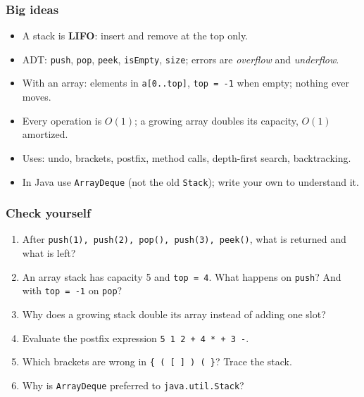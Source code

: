 \documentclass[aspectratio=169,10pt,compress]{beamer}
\begin{document}




\begin{frame}[t,fragile] \frametitle{Big ideas}
  \begin{itemize}
    \item A stack is \textbf{LIFO}: insert and remove at the top only.
    \item ADT: \texttt{push}, \texttt{pop}, \texttt{peek}, \texttt{isEmpty}, \texttt{size}; errors are \emph{overflow} and \emph{underflow}.
    \item With an array: elements in \texttt{a[0..top]}, \texttt{top = -1} when empty; nothing ever moves.
    \item Every operation is $O(1)$; a growing array doubles its capacity, $O(1)$ amortized.
    \item Uses: undo, brackets, postfix, method calls, depth-first search, backtracking.
    \item In Java use \texttt{ArrayDeque} (not the old \texttt{Stack}); write your own to understand it.
  \end{itemize}
\end{frame}




\begin{frame}[t,fragile] \frametitle{Check yourself}
  \begin{enumerate}\small
    \item After \texttt{push(1), push(2), pop(), push(3), peek()}, what is returned and what is left?
    \item An array stack has capacity 5 and \texttt{top = 4}. What happens on \texttt{push}? And with \texttt{top = -1} on \texttt{pop}?
    \item Why does a growing stack double its array instead of adding one slot?
    \item Evaluate the postfix expression \texttt{5 1 2 + 4 * + 3 -}.
    \item Which brackets are wrong in \texttt{\{ ( [ ] ) ( \}}? Trace the stack.
    \item Why is \texttt{ArrayDeque} preferred to \texttt{java.util.Stack}?
  \end{enumerate}
\end{frame}




\begin{frame}[t,fragile]
	\begin{center}
		\vspace{4cm}
	\end{center}
\end{frame}
\end{document}
